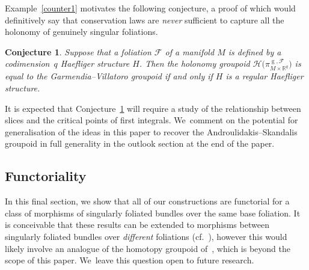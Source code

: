 \documentclass[pdftex]{sigma}
\numberwithin{equation}{section}
\newtheorem{Conjecture}[Theorem]{Conjecture}
\def\g{\operatorname{g}}
\def\FF{{\mathcal{F}}}
\def\HH{{\mathcal{H}}}
\def\RB{{\mathbb{R}}}
\begin{document}
Example~\ref{counter1} motivates the following conjecture, a proof of which would definitively say that conservation laws are \textit{never} sufficient to capture all the holonomy of genuinely singular foliations.

\begin{Conjecture}\label{Conjecture}
Suppose that a foliation $\FF$ of a manifold $M$ is defined by a codimension~$q$ Haefliger structure $H$. Then the holonomy groupoid $\HH\big(\pi_{M\times\RB^{q}}^{\g,\FF}\big)$ is equal to the Garmendia--Villatoro groupoid if and only if $H$ is a regular Haefliger structure.
\end{Conjecture}

It is expected that Conjecture~\ref{Conjecture} will require a study of the relationship between slices and the critical points of first integrals. We~comment on the potential for generalisation of the ideas in this paper to recover the Androulidakis--Skandalis groupoid in full generality in the outlook section at the end of the paper.

\subsection{Functoriality}

In this final section, we show that all of our constructions are functorial for a class of morphisms of singularly foliated bundles over the same base foliation. It is conceivable that these results can be extended to morphisms between singularly foliated bundles over \textit{different} foliations (cf.~\cite[Theorem~6.21]{VilGar1}), however this would likely involve an analogue of the homotopy groupoid of~\cite{VilGar1}, which is beyond the scope of this paper. We~leave this question open to future research.
\end{document}
